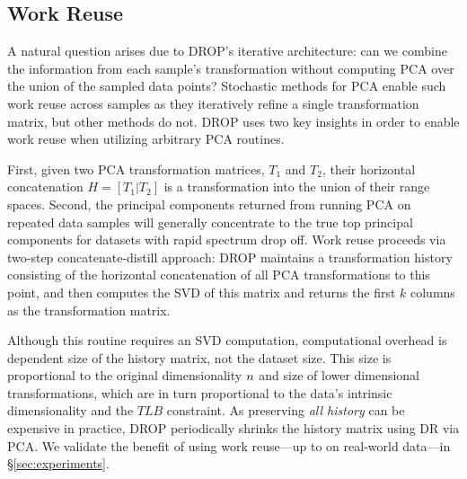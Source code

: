 \subsection{Work Reuse}
\label{subsec:reuse}

A natural question arises due to DROP's iterative architecture: can we combine the information from each sample's transformation without computing PCA over the union of the sampled data points? 
Stochastic methods for PCA enable such work reuse across samples as they iteratively refine a single transformation matrix, but other methods do not.
DROP uses two key insights in order to enable work reuse when utilizing arbitrary PCA routines.

First, given two PCA transformation matrices, $T_1$ and $T_2$, their horizontal concatenation $H = [T_1 | T_2]$ is a transformation into the union of their range spaces.
Second, the principal components returned from running PCA on repeated data samples will generally concentrate to the true top principal components for datasets with rapid spectrum drop off.
Work reuse proceeds via two-step concatenate-distill approach:
DROP maintains a transformation history consisting of the horizontal concatenation of all PCA transformations to this point, and then computes the SVD of this matrix and returns the first $k$ columns as the transformation matrix. 

Although this routine requires an SVD computation, computational overhead is dependent size of the history matrix, not the dataset size.
This size is proportional to the original dimensionality ${\color{black}n}$ and size of lower dimensional transformations, which are in turn proportional to the data's intrinsic dimensionality and the $TLB$ constraint.
As preserving \emph{all history} can be expensive in practice, 
DROP periodically shrinks the history matrix using DR via PCA. 
We validate the benefit of using work reuse---up to  on real-world data---in \S\ref{sec:experiments}.

